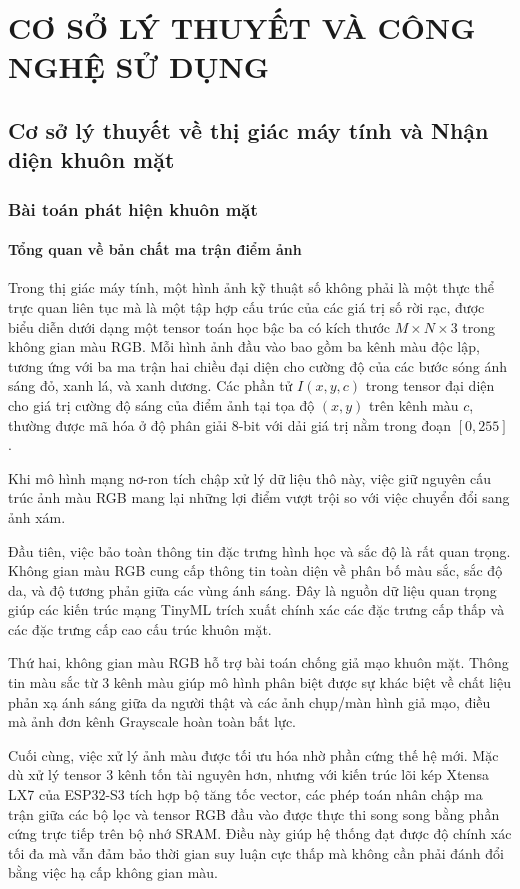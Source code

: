 \chapter{CƠ SỞ LÝ THUYẾT VÀ CÔNG NGHỆ SỬ DỤNG}
\section{Cơ sở lý thuyết về thị giác máy tính và Nhận diện khuôn mặt}

\subsection{Bài toán phát hiện khuôn mặt}

\subsubsection{Tổng quan về bản chất ma trận điểm ảnh}
Trong thị giác máy tính, một hình ảnh kỹ thuật số không phải là một thực thể trực quan liên tục mà là một tập hợp cấu trúc của các giá trị số rời rạc, được biểu diễn dưới dạng một tensor toán học bậc ba có kích thước $M \times N \times 3$ trong không gian màu RGB. Mỗi hình ảnh đầu vào bao gồm ba kênh màu độc lập, tương ứng với ba ma trận hai chiều đại diện cho cường độ của các bước sóng ánh sáng đỏ, xanh lá, và xanh dương. Các phần tử $I(x, y, c)$ trong tensor đại diện cho giá trị cường độ sáng của điểm ảnh tại tọa độ $(x, y)$ trên kênh màu $c$, thường được mã hóa ở độ phân giải 8-bit với dải giá trị nằm trong đoạn $[0, 255]$.

Khi mô hình mạng nơ-ron tích chập xử lý dữ liệu thô này, việc giữ nguyên cấu trúc ảnh màu RGB mang lại những lợi điểm vượt trội so với việc chuyển đổi sang ảnh xám.

Đầu tiên, việc bảo toàn thông tin đặc trưng hình học và sắc độ là rất quan trọng. Không gian màu RGB cung cấp thông tin toàn diện về phân bố màu sắc, sắc độ da, và độ tương phản giữa các vùng ánh sáng. Đây là nguồn dữ liệu quan trọng giúp các kiến trúc mạng TinyML trích xuất chính xác các đặc trưng cấp thấp và các đặc trưng cấp cao cấu trúc khuôn mặt.

Thứ hai, không gian màu RGB hỗ trợ bài toán chống giả mạo khuôn mặt. Thông tin màu sắc từ 3 kênh màu giúp mô hình phân biệt được sự khác biệt về chất liệu phản xạ ánh sáng giữa da người thật và các ảnh chụp/màn hình giả mạo, điều mà ảnh đơn kênh Grayscale hoàn toàn bất lực.

Cuối cùng, việc xử lý ảnh màu được tối ưu hóa nhờ phần cứng thế hệ mới. Mặc dù xử lý tensor 3 kênh tốn tài nguyên hơn, nhưng với kiến trúc lõi kép Xtensa LX7 của ESP32-S3 tích hợp bộ tăng tốc vector, các phép toán nhân chập ma trận giữa các bộ lọc và tensor RGB đầu vào được thực thi song song bằng phần cứng trực tiếp trên bộ nhớ SRAM. Điều này giúp hệ thống đạt được độ chính xác tối đa mà vẫn đảm bảo thời gian suy luận cực thấp mà không cần phải đánh đổi bằng việc hạ cấp không gian màu.

